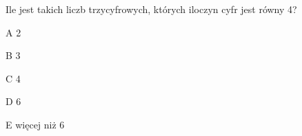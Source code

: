 \begin{tresc}
Ile jest takich liczb trzycyfrowych, których iloczyn cyfr jest równy 4?
\end{tresc}
\begin{wariant}{A} 2 \end{wariant}
\begin{wariant}{B} 3 \end{wariant}
\begin{wariant}{C} 4 \end{wariant}
\begin{wariant}{D} 6 \end{wariant}
\begin{wariant}{E} więcej niż 6 \end{wariant}
